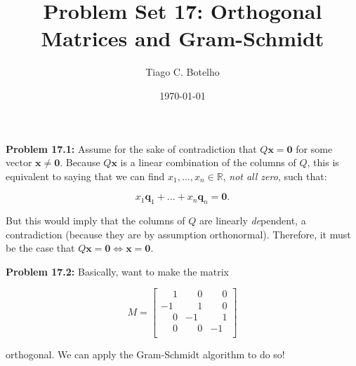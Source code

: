 \documentclass{article}
\title{Problem Set 17: Orthogonal Matrices and Gram-Schmidt}
\author{Tiago C. Botelho}
\date{\today}
\begin{document}
\maketitle

\noindent \textbf{Problem 17.1:} Assume for the sake of contradiction that $Q\mathbf{x = 0}$ for some vector $\mathbf{x \neq 0}$. Because $Q\mathbf{x}$ is a linear combination of the columns of $Q$, this is equivalent to saying that we can find $x_1, ..., x_n \in \mathbb{R}$, \textit{not all zero}, such that:

\[
x_1 \mathbf{q}_1 + ... + x_n \mathbf{q}_n = \mathbf{0}.
\]

But this would imply that the columns of $Q$ are linearly \textit{de}pendent, a contradiction (because they are by assumption orthonormal). Therefore, it must be the case that $Q\mathbf{x = 0} \iff \mathbf{x = 0}$.

\noindent \textbf{Problem 17.2:} Basically, want to make the matrix

\[
M = \begin{bmatrix}
\phantom{-}1 & \phantom{-}0 & \phantom{-}0\\
-1 & \phantom{-}1 & \phantom{-}0\\
\phantom{-}0 & -1 & \phantom{-}1\\
\phantom{-}0 & \phantom{-}0 & -1\\
\end{bmatrix}
\]

orthogonal. We can apply the Gram-Schmidt algorithm to do so!
\end{document}
